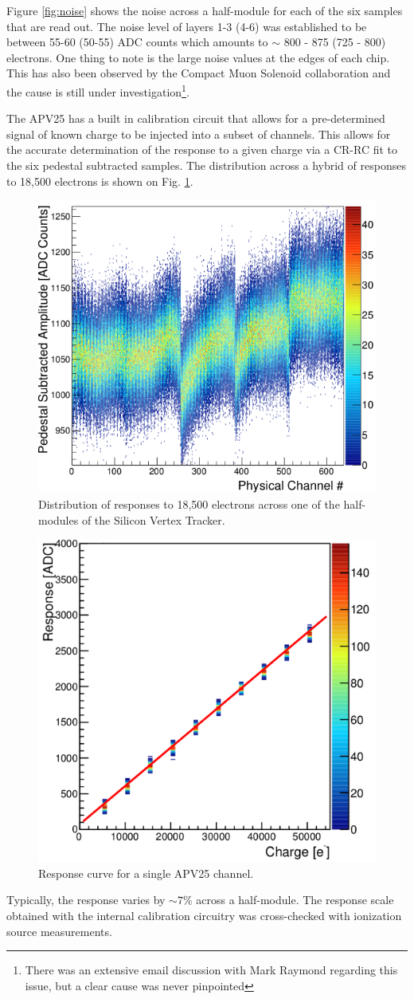 Figure \ref{fig:noise} shows the noise across a half-module for each of the 
six samples that are read out.
The noise level of layers 1-3 (4-6) was established
to be between 55-60 (50-55) ADC counts which amounts to $\sim$ 800 - 875 (725 - 800) 
electrons. One thing to note is the large noise values at
the edges of each chip.  This has also been observed by the Compact Muon
Solenoid collaboration
and the cause is still under investigation\footnote{There was an extensive email
discussion with Mark Raymond regarding this issue, but a clear cause was never
pinpointed}. 

The APV25 has a built in calibration circuit that allows for a 
pre-determined signal of known charge to be injected into a subset of channels.
This allows for the accurate determination of the response to a given charge 
via a CR-RC fit
to the six pedestal subtracted samples.  The distribution across a hybrid 
of responses to 18,500 electrons is shown on Fig. \ref{fig:response}.
\begin{figure}[h!t]
    \centering
    \includegraphics[width=.6\textwidth]{images/response.png}
    \caption{Distribution of responses to 18,500 electrons across one of the 
             half-modules of the Silicon Vertex Tracker.}
    \label{fig:response}
\end{figure}
\begin{figure}[h!b]
    \centering
    \includegraphics[width=.6\textwidth]{images/response_curve.png}
    \caption{Response curve for a single APV25 channel.}
    \label{fig:response_curve}
\end{figure}
Typically, the response varies by $\sim 7$\% across a half-module. 
The response scale obtained with
the internal calibration circuitry was cross-checked with ionization source
measurements.  

